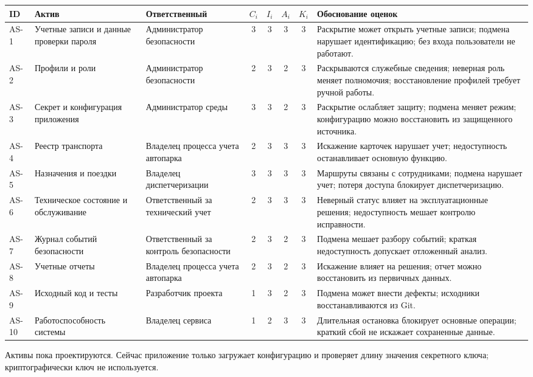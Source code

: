\documentclass[12pt,a4paper]{article}
\begin{document}
\begin{landscape}
\small
\begin{longtable}{p{1.1cm}p{3.2cm}p{3.2cm}ccccp{9.2cm}}
\toprule ID & Актив & Ответственный & $C_i$ & $I_i$ & $A_i$ & $K_i$ & Обоснование оценок \\
\midrule\endhead
AS-1 & Учетные записи и данные проверки пароля & Администратор безопасности & 3 & 3 & 3 & 3 & Раскрытие может открыть учетные записи; подмена нарушает идентификацию; без входа пользователи не работают. \\
AS-2 & Профили и роли & Администратор безопасности & 2 & 3 & 2 & 3 & Раскрываются служебные сведения; неверная роль меняет полномочия; восстановление профилей требует ручной работы. \\
AS-3 & Секрет и конфигурация приложения & Администратор среды & 3 & 3 & 2 & 3 & Раскрытие ослабляет защиту; подмена меняет режим; конфигурацию можно восстановить из защищенного источника. \\
AS-4 & Реестр транспорта & Владелец процесса учета автопарка & 2 & 3 & 3 & 3 & Искажение карточек нарушает учет; недоступность останавливает основную функцию. \\
AS-5 & Назначения и поездки & Владелец диспетчеризации & 3 & 3 & 3 & 3 & Маршруты связаны с сотрудниками; подмена нарушает учет; потеря доступа блокирует диспетчеризацию. \\
AS-6 & Техническое состояние и обслуживание & Ответственный за технический учет & 2 & 3 & 3 & 3 & Неверный статус влияет на эксплуатационные решения; недоступность мешает контролю исправности. \\
AS-7 & Журнал событий безопасности & Ответственный за контроль безопасности & 2 & 3 & 2 & 3 & Подмена мешает разбору событий; краткая недоступность допускает отложенный анализ. \\
AS-8 & Учетные отчеты & Владелец процесса учета автопарка & 2 & 3 & 2 & 3 & Искажение влияет на решения; отчет можно восстановить из первичных данных. \\
AS-9 & Исходный код и тесты & Разработчик проекта & 1 & 3 & 2 & 3 & Подмена может внести дефекты; исходники восстанавливаются из Git. \\
AS-10 & Работоспособность системы & Владелец сервиса & 1 & 2 & 3 & 3 & Длительная остановка блокирует основные операции; краткий сбой не искажает сохраненные данные. \\
\bottomrule
\end{longtable}
Активы пока проектируются. Сейчас приложение только загружает конфигурацию и проверяет длину значения секретного ключа; криптографически ключ не используется.
\end{landscape}
\end{document}

